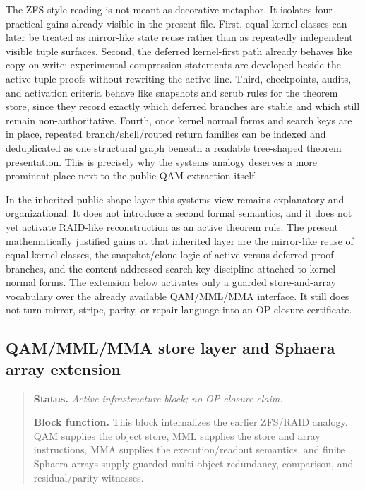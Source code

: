 \begin{remark}\label{rem:qam-zfs-utility}
The ZFS-style reading is not meant as decorative metaphor. It isolates four practical gains already visible in the present file. First, equal kernel classes can later be treated as mirror-like state reuse rather than as repeatedly independent visible tuple surfaces. Second, the deferred kernel-first path already behaves like copy-on-write: experimental compression statements are developed beside the active tuple proofs without rewriting the active line. Third, checkpoints, audits, and activation criteria behave like snapshots and scrub rules for the theorem store, since they record exactly which deferred branches are stable and which still remain non-authoritative. Fourth, once kernel normal forms and search keys are in place, repeated branch/shell/routed return families can be indexed and deduplicated as one structural graph beneath a readable tree-shaped theorem presentation. This is precisely why the systems analogy deserves a more prominent place next to the public QAM extraction itself.
\end{remark}

\begin{remark}\label{rem:qam-vm-os-scope}
In the inherited  public-shape layer this systems view remains explanatory and organizational. It does not introduce a second formal semantics, and it does not yet activate RAID-like reconstruction as an active theorem rule. The present mathematically justified gains at that inherited layer are the mirror-like reuse of equal kernel classes, the snapshot/clone logic of active versus deferred proof branches, and the content-addressed search-key discipline attached to kernel normal forms. The  extension below activates only a guarded store-and-array vocabulary over the already available QAM/MML/MMA interface. It still does not turn mirror, stripe, parity, or repair language into an OP-closure certificate.
\end{remark}


\subsection*{QAM/MML/MMA store layer and Sphaera array extension}
\begin{quote}\small
\noindent\textbf{Status.} \emph{Active  infrastructure block; no OP closure claim.}\par
\noindent\textbf{Block function.} This block internalizes the earlier ZFS/RAID analogy. QAM supplies the object store, MML supplies the store and array instructions, MMA supplies the execution/readout semantics, and finite Sphaera arrays supply guarded multi-object redundancy, comparison, and residual/parity witnesses.
\end{quote}

